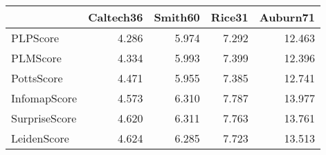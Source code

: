 \begin{tabular}{lrrrr}
\toprule
{} & Caltech36 & Smith60 & Rice31 & Auburn71 \\
\midrule
PLPScore      &     4.286 &   5.974 &  7.292 &   12.463 \\
PLMScore      &     4.334 &   5.993 &  7.399 &   12.396 \\
PottsScore    &     4.471 &   5.955 &  7.385 &   12.741 \\
InfomapScore  &     4.573 &   6.310 &  7.787 &   13.977 \\
SurpriseScore &     4.620 &   6.311 &  7.763 &   13.761 \\
LeidenScore   &     4.624 &   6.285 &  7.723 &   13.513 \\
\bottomrule
\end{tabular}
